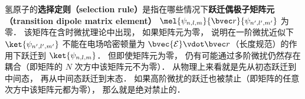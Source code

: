
\begin{issues}
\issueDraft
\end{issues}


氢原子的\textbf{选择定则（selection rule）}是指在哪些情况下\textbf{跃迁偶极子矩阵元（transition dipole matrix element）} $\mel{\psi_{n,l,m}}{\bvec r}{\psi_{n',l',m'}}$ 为零． 该矩阵在含时微扰理论中出现， 如果矩阵元为零， 说明在一阶微扰近似下 $\ket{\psi_{n',l',m'}}$ 不能在电场哈密顿量为 $\bvec{\mathcal{E}}\vdot \bvec r$（长度规范）的作用下跃迁到 $\ket{\psi_{n,l,m}}$． 但即使矩阵元为零， 仍有可能通过多阶微扰仍然存在耦合（即矩阵的 $N$ 次方中该矩阵元不为零）． 从物理上来看就是先从初态跃迁到中间态， 再从中间态跃迁到末态． 如果高阶微扰的跃迁也被禁止（即矩阵的任意次方中该矩阵元都为零）， 那么就是绝对禁止的． %

